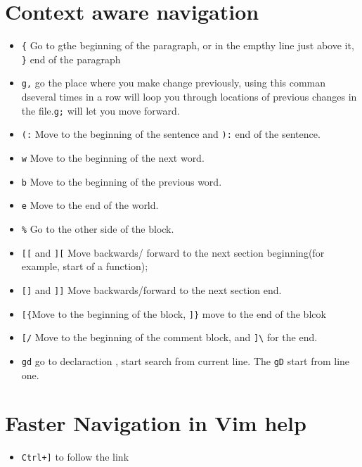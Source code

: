 \documentclass[11pt]{book}
\begin{document}
 \section{Context aware navigation}
 \begin{itemize}
 \item \verb|{| Go to gthe beginning of the paragraph, or in the empthy line
  just above it, \verb|}| end of the paragraph
 \item \verb|g,| go the place where you make change previously, using this
 comman dseveral times in a row will loop you through locations of previous
 changes in the file.\verb|g;| will let you move forward.
 \item \verb|(:| Move to the beginning of the sentence and \verb|):| end of the
 sentence.
 \item \verb|w| Move to the beginning of the next word.
 \item \verb|b| Move to the beginning of the previous word.
 \item \verb|e| Move to the end of the world.
 \item \verb|%| Go to the other side of the block.
 \item \verb|[[| and \verb|][| Move backwards/ forward to the next section
 beginning(for example, start of a function);
 \item \verb|[]| and \verb|]]| Move backwards/forward to the next section end.
 \item \verb|[{|Move to the beginning of the block, \verb|]}| move to the end of
 the blcok
 \item \verb|[/| Move to the beginning of the comment block, and \verb|]\| for
 the end.
 \item \verb|gd| go to declaraction , start search from current line. The 
 \verb|gD| start from line one. 
 \end{itemize}
 \section{Faster Navigation in Vim help}
 \begin{itemize}
 \item \verb|Ctrl+]| to follow the link
 \end{itemize}
\end{document}
